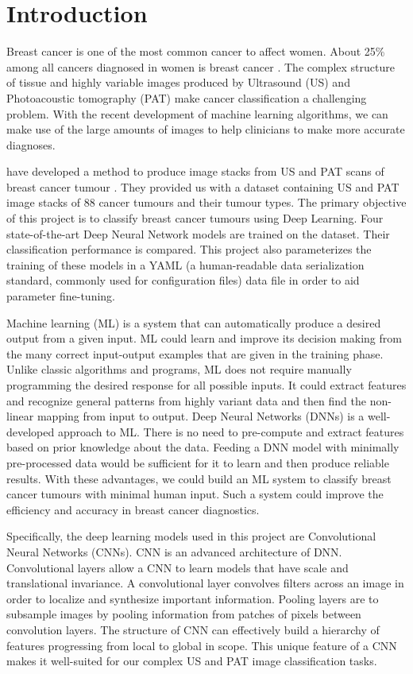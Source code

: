 \chapter{Introduction} %

Breast cancer is one of the most common cancer to affect women. About 25\% among all cancers diagnosed in women is breast cancer \citep{Siegel2015}. The complex structure of tissue and highly variable images produced by Ultrasound (US) and Photoacoustic tomography (PAT) make cancer classification a challenging problem. With the recent development of machine learning algorithms, we can make use of the large amounts of images to help clinicians to make more accurate diagnoses. 

\citeauthor{Kosik2019} have developed a method to produce image stacks from US and PAT scans of breast cancer tumour \citep{Kosik2019}. They provided us with a dataset containing US and PAT image stacks of 88 cancer tumours and their tumour types. The primary objective of this project is to classify breast cancer tumours using Deep Learning. Four state-of-the-art Deep Neural Network models are trained on the dataset. Their classification performance is compared. This project also parameterizes the training of these models in a YAML \citep{yaml} (a human-readable data serialization standard, commonly used for configuration files) data file in order to aid parameter fine-tuning.

Machine learning (ML) is a system that can automatically produce a desired output from a given input. ML could learn and improve its decision making from the many correct input-output examples that are given in the training phase. Unlike classic algorithms and programs, ML does not require manually programming the desired response for all possible inputs. It could extract features and recognize general patterns from highly variant data and then find the non-linear mapping from input to output. Deep Neural Networks (DNNs) \citep{LeCun2015} is a well-developed approach to ML. There is no need to pre-compute and extract features based on prior knowledge about the data. Feeding a DNN model with minimally pre-processed data would be sufficient for it to learn and then produce reliable results. With these advantages, we could build an ML system to classify breast cancer tumours with minimal human input. Such a system could improve the efficiency and accuracy in breast cancer diagnostics.

Specifically, the deep learning models used in this project are Convolutional Neural Networks (CNNs). CNN \citep{Krizhevsky2017} is an advanced architecture of DNN. Convolutional layers allow a CNN to learn models that have scale and translational invariance. A convolutional layer convolves filters across an image in order to localize and synthesize important information. Pooling layers are to subsample images by pooling information from patches of pixels between convolution layers. The structure of CNN can effectively build a hierarchy of features progressing from local to global in scope. This unique feature of a CNN makes it well-suited for our complex US and PAT image classification tasks.

